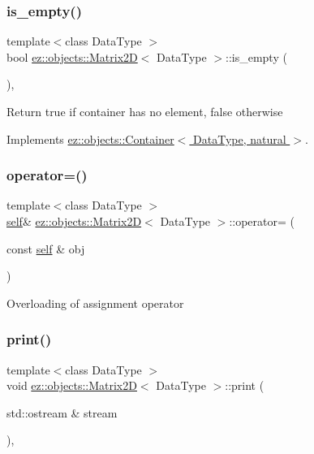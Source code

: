 \subsubsection{\texorpdfstring{is\+\_\+empty()}{is\_empty()}}
{\footnotesize\ttfamily template$<$class Data\+Type $>$ \\
bool \hyperlink{classez_1_1objects_1_1Matrix2D}{ez\+::objects\+::\+Matrix2D}$<$ Data\+Type $>$\+::is\+\_\+empty (\begin{DoxyParamCaption}{ }\end{DoxyParamCaption})\hspace{0.3cm}{\ttfamily [inline]}, {\ttfamily [virtual]}}

Return true if container has no element, false otherwise 

Implements \hyperlink{classez_1_1objects_1_1Container_a205eb4f8a4fe967d425fdf04e5db5f93}{ez\+::objects\+::\+Container$<$ Data\+Type, natural $>$}.

\mbox{\label{classez_1_1objects_1_1Matrix2D_a693a0c5feb9dd40f8a3f72abc7680f46}} 
\subsubsection{\texorpdfstring{operator=()}{operator=()}}
{\footnotesize\ttfamily template$<$class Data\+Type $>$ \\
\hyperlink{classez_1_1objects_1_1Matrix2D}{self}\& \hyperlink{classez_1_1objects_1_1Matrix2D}{ez\+::objects\+::\+Matrix2D}$<$ Data\+Type $>$\+::operator= (\begin{DoxyParamCaption}\item[{const \hyperlink{classez_1_1objects_1_1Matrix2D}{self} \&}]{obj }\end{DoxyParamCaption})\hspace{0.3cm}{\ttfamily [inline]}}

Overloading of assignment operator \mbox{\label{classez_1_1objects_1_1Matrix2D_aeef806111fdd458dfcf1f09addd7a0b7}} 
\subsubsection{\texorpdfstring{print()}{print()}}
{\footnotesize\ttfamily template$<$class Data\+Type $>$ \\
void \hyperlink{classez_1_1objects_1_1Matrix2D}{ez\+::objects\+::\+Matrix2D}$<$ Data\+Type $>$\+::print (\begin{DoxyParamCaption}\item[{std\+::ostream \&}]{stream }\end{DoxyParamCaption})\hspace{0.3cm}{\ttfamily [inline]}, {\ttfamily [virtual]}}

